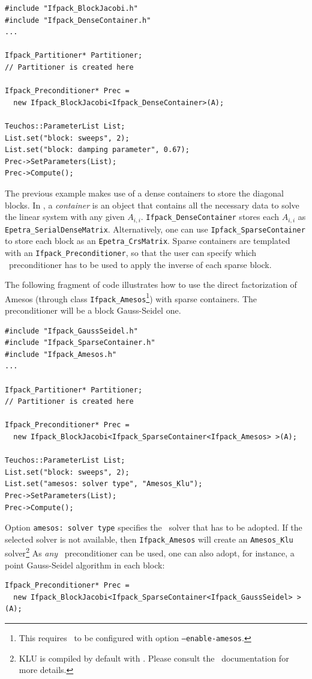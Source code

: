 \begin{verbatim}
#include "Ifpack_BlockJacobi.h"
#include "Ifpack_DenseContainer.h"
...

Ifpack_Partitioner* Partitioner;
// Partitioner is created here

Ifpack_Preconditioner* Prec =
  new Ifpack_BlockJacobi<Ifpack_DenseContainer>(A);

Teuchos::ParameterList List;
List.set("block: sweeps", 2);
List.set("block: damping parameter", 0.67);
Prec->SetParameters(List);
Prec->Compute();
\end{verbatim}
The previous example makes use of a dense containers to store
the diagonal blocks.
In \ifpack, a {\sl container} is an object that contains all the necessary
data to solve the linear system with any given $A_{i,i}$. 
\verb!Ifpack_DenseContainer! stores each $A_{i,i}$ as
\verb!Epetra_SerialDenseMatrix!. Alternatively, one can use 
\verb!Ipfack_SparseContainer! to store each block as an
\verb!Epetra_CrsMatrix!. Sparse containers are templated with an
\verb!Ifpack_Preconditioner!, so that the user can specify which \ifpack\
  preconditioner has to be used to apply the inverse of each sparse block.

The following fragment of code illustrates how to use the direct factorization
of Amesos (through class \verb!Ifpack_Amesos!\footnote{This requires \ifpack\
	   to be configured with option {\tt --enable-amesos}.}) with sparse containers. The preconditioner will be a block Gauss-Seidel one.

\begin{verbatim}
#include "Ifpack_GaussSeidel.h"
#include "Ifpack_SparseContainer.h"
#include "Ifpack_Amesos.h"
...

Ifpack_Partitioner* Partitioner;
// Partitioner is created here

Ifpack_Preconditioner* Prec =
  new Ifpack_BlockJacobi<Ifpack_SparseContainer<Ifpack_Amesos> >(A);

Teuchos::ParameterList List;
List.set("block: sweeps", 2);
List.set("amesos: solver type", "Amesos_Klu");
Prec->SetParameters(List);
Prec->Compute();
\end{verbatim}

Option \verb!amesos: solver type! specifies the \amesos\ solver that
has to be adopted. If the selected solver is not available, then
\verb!Ifpack_Amesos! will create an \verb!Amesos_Klu! solver\footnote{KLU is
  compiled by default with \amesos. Please consult the \amesos\ documentation
    for more details.}
As {\sl any} \ifpack\ preconditioner can be used, one can also adopt, for
instance, a point Gauss-Seidel algorithm in each block:
\begin{verbatim}
Ifpack_Preconditioner* Prec =
  new Ifpack_BlockJacobi<Ifpack_SparseContainer<Ifpack_GaussSeidel> >(A);
\end{verbatim}

